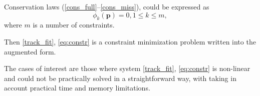 %


Conservation laws (\ref{cons_full}--\ref{cons_miss}), could be expressed as
\begin{equation}
\label{eq:constr}
\phi_k(\boldsymbol{p}) = 0, 1 \leqslant k  \leqslant m,
\end{equation}
where $m$ is a number of constraints.

Then \eqref{track_fit}, \eqref{eq:constr} is a constraint minimization problem written into the augmented form.

The cases of interest are those where system \eqref{track_fit}, \eqref{eq:constr} is non-linear and could not be practically solved in a straightforward way, with taking in account practical time and memory limitations. %

